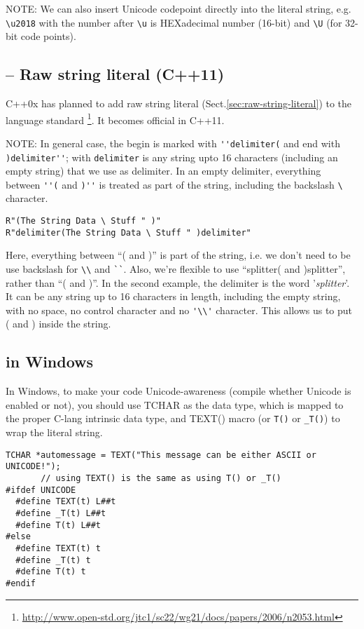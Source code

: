 NOTE: We can also insert Unicode codepoint directly into the literal string,
e.g. \verb!\u2018! with the number after \verb!\u! is HEXadecimal number
(16-bit) and \verb!\U! (for 32-bit code points).

\subsection{-- Raw string literal (C++11)}
\label{sec:raw_string_literal-C++11}


C++0x has planned to add raw string literal
(Sect.\ref{sec:raw-string-literal}) to the language standard
\footnote{\url{http://www.open-std.org/jtc1/sc22/wg21/docs/papers/2006/n2053.html}}.
It becomes official in C++11.

NOTE: In general case, the begin is marked with \verb!''delimiter(! and end with
\verb!)delimiter''!; with \verb!delimiter! is any string upto 16 characters
(including an empty string) that we use as delimiter.
In an empty delimiter, everything between \verb!''(! and \verb!)''!
is treated as part of the string, including the backslash \verb!\! character. 

\begin{verbatim}
R"(The String Data \ Stuff " )"
R"delimiter(The String Data \ Stuff " )delimiter"
\end{verbatim}
Here, everything between ``( and )'' is part of the string, i.e. we don't need
to be use backslash for \verb!\\! and \verb!``!. Also, we're flexible to use
``splitter( and )splitter'', rather than ``( and )''. In the second example, the delimiter is
the word '{\it splitter}'. It can be any string up to 16 characters in length,
including the empty string, with no space, no control character and no
\verb!'\\'! character. This allows us to put ( and ) inside the string.

\subsection{in Windows}

In Windows, to make your code Unicode-awareness (compile whether Unicode is
enabled or not), you should use TCHAR as the data type, which is mapped to the proper C-lang
intrinsic data type, and TEXT() macro (or \verb!T()! or \verb!_T()!) to wrap the
literal string.
\begin{verbatim}
TCHAR *automessage = TEXT("This message can be either ASCII or UNICODE!");
       // using TEXT() is the same as using T() or _T()
#ifdef UNICODE
  #define TEXT(t) L##t
  #define _T(t) L##t
  #define T(t) L##t
#else
  #define TEXT(t) t
  #define _T(t) t
  #define T(t) t
#endif       
\end{verbatim}

